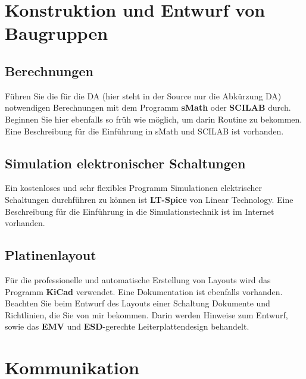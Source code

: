 \documentclass[a4paper, 12pt, xcolor=dvipsnames]{scrartcl}	%
\begin{document}
\pagebreak

\section{Konstruktion und Entwurf von Baugruppen}				%
\subsection{Berechnungen}													%
Führen Sie die für die \acs{DA} (hier steht in der Source nur die Abkürzung DA) notwendigen Berechnungen mit dem Programm \textbf{sMath} oder \textbf{SCILAB} durch. Beginnen Sie hier ebenfalls so früh wie möglich, um darin Routine zu bekommen. Eine Beschreibung für die Einführung in sMath und SCILAB ist vorhanden.
\vspace{-0.6cm}																	%

\subsection{Simulation elektronischer Schaltungen}				%
Ein kostenloses und sehr flexibles Programm Simulationen elektrischer Schaltungen durchführen zu können ist \textbf{LT-Spice} von Linear Technology. Eine Beschreibung für die Einführung in die Simulationstechnik ist im Internet vorhanden.
\vspace{-0.6cm}																	%

\subsection{Platinenlayout}													%
Für die professionelle und automatische Erstellung von Layouts wird das Programm \textbf{KiCad} verwendet. Eine Dokumentation ist ebenfalls vorhanden.\\
Beachten Sie beim Entwurf des Layouts einer Schaltung Dokumente und Richtlinien, die Sie von mir bekommen. Darin werden Hinweise zum Entwurf, sowie das \textbf{EMV} und \textbf{ESD}-gerechte Leiterplattendesign behandelt.

\section{Kommunikation}													%
\end{document}
